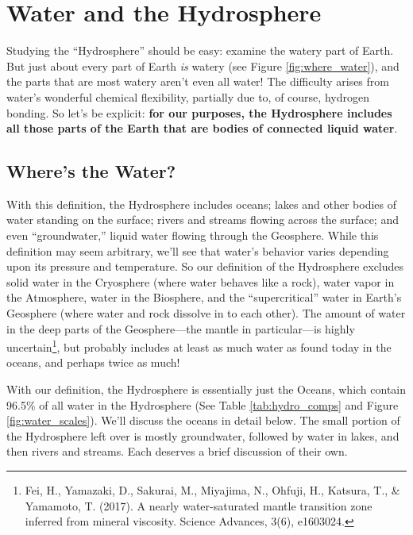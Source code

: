 \documentclass[amstex,12pt]{book}
\begin{document}
\section{Water and the Hydrosphere} \label{Water and the Hydrosphere}
Studying the ``Hydrosphere'' should be easy: examine the watery part of Earth. But just about every part of Earth \emph{is} watery (see Figure \ref{fig:where_water}), and the parts that are most watery aren't even all water! The difficulty arises from water's wonderful chemical flexibility, partially due to, of course, hydrogen bonding. So let's be explicit: \textbf{for our purposes, the Hydrosphere includes all those parts of the Earth that are bodies of connected liquid water}. 
\subsection{Where's the Water?}
With this definition, the Hydrosphere includes oceans; lakes and other bodies of water standing on the surface; rivers and streams flowing across the surface; and even ``groundwater,'' liquid water flowing through the Geosphere. While this definition may seem arbitrary, we'll see that water's behavior varies depending upon its pressure and temperature. So our definition of the Hydrosphere excludes solid water in the Cryosphere (where water behaves like a rock), water vapor in the Atmosphere, water in the Biosphere, and the ``supercritical'' water in Earth's Geosphere (where water and rock dissolve in to each other). The amount of water in the deep parts of the Geosphere---the mantle in particular---is highly uncertain\footnote{Fei, H., Yamazaki, D., Sakurai, M., Miyajima, N., Ohfuji, H., Katsura, T., \& Yamamoto, T. (2017). A nearly water-saturated mantle transition zone inferred from mineral viscosity. Science Advances, 3(6), e1603024.}, but probably includes at least as much water as found today in the oceans, and perhaps twice as much! 
    
With our definition, the Hydrosphere is essentially just the Oceans, which contain 96.5\% of all water in the Hydrosphere (See Table \ref{tab:hydro_comps} and Figure \ref{fig:water_scales}). We'll discuss the oceans in detail below. The small portion of the Hydrosphere left over is mostly groundwater, followed by water in lakes, and then rivers and streams. Each deserves a brief discussion of their own.
\end{document}
